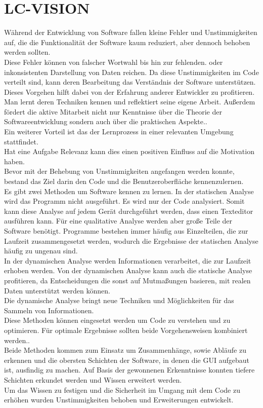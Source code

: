 \documentclass[12pt,a4paper]{article}
\begin{document}
\section{LC-VISION}
Während der Entwicklung von Software fallen kleine Fehler und Unstimmigkeiten auf, die die Funktionalität der Software kaum reduziert, aber dennoch behoben werden sollten. \\
Diese Fehler können von falscher Wortwahl bis hin zur fehlenden. oder inkonsistenten Darstellung von Daten reichen. Da diese Unstimmigkeiten im Code verteilt sind, kann deren Bearbeitung das Verständnis der Software unterstützen.\\
Dieses Vorgehen hilft dabei von der Erfahrung anderer Entwickler zu profitieren. Man lernt deren Techniken kennen und reflektiert seine eigene Arbeit. Außerdem fördert die aktive Mitarbeit nicht nur Kenntnisse über die Theorie der Softwareentwicklung sondern auch über die praktischen Aspekte.\cite{34908}.\\
Ein weiterer Vorteil ist das der Lernprozess in einer relevanten Umgebung stattfindet\cite{34908}.\\
Hat eine Aufgabe Relevanz kann dies einen positiven Einfluss auf die Motivation haben. \\
Bevor mit der Behebung von Unstimmigkeiten angefangen werden konnte, bestand das Ziel darin den Code und die Benutzeroberfläche kennenzulernen. \\
Es gibt zwei Methoden um Software kennen zu lernen. In der statischen Analyse wird das Programm nicht ausgeführt. Es wird nur der Code analysiert\cite{mock2003dynamic}. Somit kann diese Analyse auf jedem Gerät durchgeführt werden, dass einen Texteditor ausführen kann. Für eine qualitative Analyse werden aber große Teile der Software benötigt. Programme bestehen immer häufig aus Einzelteilen, die zur Laufzeit zusammengesetzt werden, wodurch die Ergebnisse der statischen Analyse häufig zu ungenau sind\cite{mock2003dynamic}.\\
In der dynamischen Analyse werden Informationen verarbeitet, die zur Laufzeit erhoben werden. Von der dynamischen Analyse kann auch die statische Analyse profitieren, da Entscheidungen die sonst auf Mutmaßungen basieren, mit realen Daten unterstützt werden können\cite{mock2003dynamic}.\\
Die dynamische Analyse bringt neue Techniken und Möglichkeiten für das Sammeln von Informationen\cite{mock2003dynamic}.\\
Diese Methoden können eingesetzt werden um Code zu verstehen und zu optimieren. Für optimale Ergebnisse sollten beide Vorgehensweisen kombiniert werden.\cite{mock2003dynamic}.\\
Beide Methoden kommen zum Einsatz um Zusammenhänge, sowie Abläufe zu erkennen und die obersten Schichten der Software, in denen die \ac{GUI} aufgebaut ist, ausfindig zu machen. Auf Basis der gewonnenen Erkenntnisse konnten tiefere Schichten erkundet werden und Wissen erweitert werden.\\
Um das Wissen zu festigen und die Sicherheit im Umgang mit dem Code zu erhöhen wurden Unstimmigkeiten behoben und Erweiterungen entwickelt. \\


\newpage


\end{document}
